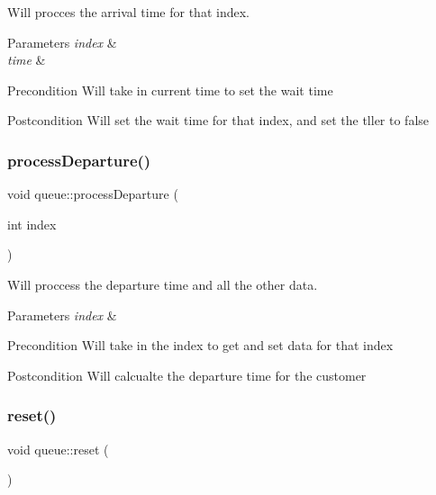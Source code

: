 Will procces the arrival time for that index. 


\begin{DoxyParams}{Parameters}
{\em index} & \\
\hline
{\em time} & \\
\hline
\end{DoxyParams}
\begin{DoxyPrecond}{Precondition}
Will take in current time to set the wait time 
\end{DoxyPrecond}
\begin{DoxyPostcond}{Postcondition}
Will set the wait time for that index, and set the tller to false 
\end{DoxyPostcond}
\mbox{\label{classqueue_a2fcf02e929268e153260003c43cfc458}} 
\subsubsection{\texorpdfstring{process\+Departure()}{processDeparture()}}
{\footnotesize\ttfamily void queue\+::process\+Departure (\begin{DoxyParamCaption}\item[{int}]{index }\end{DoxyParamCaption})}



Will proccess the departure time and all the other data. 


\begin{DoxyParams}{Parameters}
{\em index} & \\
\hline
\end{DoxyParams}
\begin{DoxyPrecond}{Precondition}
Will take in the index to get and set data for that index 
\end{DoxyPrecond}
\begin{DoxyPostcond}{Postcondition}
Will calcualte the departure time for the customer 
\end{DoxyPostcond}
\mbox{\label{classqueue_a4c691b7156868dd42856defa80f2c182}} 
\subsubsection{\texorpdfstring{reset()}{reset()}}
{\footnotesize\ttfamily void queue\+::reset (\begin{DoxyParamCaption}{ }\end{DoxyParamCaption})}

